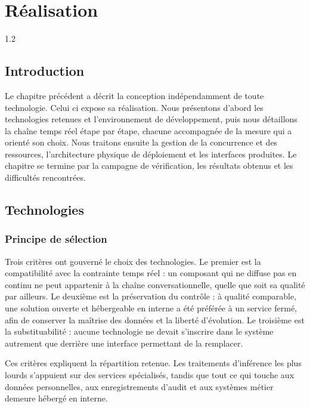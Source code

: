 \chapter{Réalisation}

\begin{spacing}{1.2}
\minitoc
\thispagestyle{MyStyle}
\end{spacing}
\newpage

\section*{Introduction}

Le chapitre précédent a décrit la conception indépendamment de toute technologie. Celui ci expose sa réalisation. Nous présentons d'abord les technologies retenues et l'environnement de développement, puis nous détaillons la chaîne temps réel étape par étape, chacune accompagnée de la mesure qui a orienté son choix. Nous traitons ensuite la gestion de la concurrence et des ressources, l'architecture physique de déploiement et les interfaces produites. Le chapitre se termine par la campagne de vérification, les résultats obtenus et les difficultés rencontrées.

\section{Technologies}

\subsection{Principe de sélection}

Trois critères ont gouverné le choix des technologies. Le premier est la compatibilité avec la contrainte temps réel : un composant qui ne diffuse pas en continu ne peut appartenir à la chaîne conversationnelle, quelle que soit sa qualité par ailleurs. Le deuxième est la préservation du contrôle : à qualité comparable, une solution ouverte et hébergeable en interne a été préférée à un service fermé, afin de conserver la maîtrise des données et la liberté d'évolution. Le troisième est la substituabilité : aucune technologie ne devait s'inscrire dans le système autrement que derrière une interface permettant de la remplacer.

Ces critères expliquent la répartition retenue. Les traitements d'inférence les plus lourds s'appuient sur des services spécialisés, tandis que tout ce qui touche aux données personnelles, aux enregistrements d'audit et aux systèmes métier demeure hébergé en interne.


